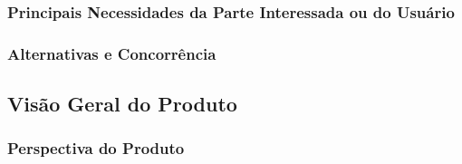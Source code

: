\subsubsection{Principais Necessidades da Parte Interessada ou do Usuário}
 	 	 	 	 
\subsubsection{Alternativas e Concorrência}

\subsection{Visão Geral do Produto}

\subsubsection{Perspectiva do Produto}


